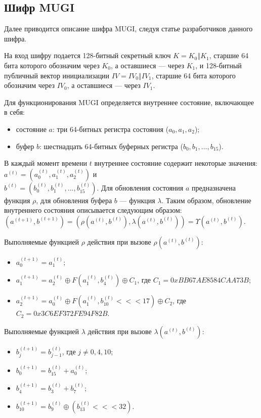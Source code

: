 \documentclass{./civarticle}
\begin{document}
\subsection{Шифр MUGI}
Далее приводится описание шифра MUGI, следуя статье \cite{mugi} разработчиков данного шифра.

На вход шифру подается 128-битный секретный ключ $K = K_0 \mathbin\Vert K_1$, старшие 64 бита которого обозначим через $K_0$, а оставшиеся --- через $K_1$, и 128-битный публичный вектор инициализации $IV = IV_0 \mathbin\Vert IV_1$, старшие 64 бита которого обозначим через $IV_0$, а оставшиеся --- через $IV_1$.

Для функционирования MUGI определяется внутреннее состояние, включающее в себя:
\begin{itemize}
    \item состояние $a$: три 64-битных регистра состояния ($a_0, a_1, a_2$);
    \item буфер $b$: шестнадцать 64-битных буферных регистра ($b_0, b_1, ..., b_{15}$).
\end{itemize}
В каждый момент времени $t$ внутреннее состояние содержит некоторые значения: $a^{(t)} = (a_0^{(t)}, a_1^{(t)}, a_2^{(t)})$ и \\ $b^{(t)} = (b_0^{(t)}, b_1^{(t)}, ..., b_{15}^{(t)})$. Для обновления состояния $a$ предназначена функция $\rho$, для обновления буфера $b$ --- функция $\lambda$. Таким образом, обновление внутреннего состояния описывается следующим образом: \\ $(a^{(t+1)}, b^{(t+1)}) = (\rho(a^{(t)}, b^{(t)}), \lambda(a^{(t)}, b^{(t)})) = \Upsilon(a^{(t)}, b^{(t)})$.


Выполняемые функцией $\rho$ действия при вызове $\rho(a^{(t)}, b^{(t)})$:
\begin{itemize}
    \item $a_0^{(t+1)} = a_1^{(t)}$;
    \item $a_1^{(t+1)} = a_2^{(t)} \oplus F(a_1^{(t)}, b_4^{(t)}) \oplus C_1$, где $C_1 = 0xBB67AE8584CAA73B$;
    \item $a_2^{(t+1)} = a_0^{(t)} \oplus F(a_1^{(t)}, b_{10}^{(t)} <<< 17) \oplus C_2$, где $C_2 = 0x3C6EF372FE94F82B$.
\end{itemize}

Выполняемые функцией $\lambda$ действия при вызове $\lambda(a^{(t)}, b^{(t)})$:
\begin{itemize}
    \item $b_j^{(t+1)} = b_{j-1}^{(t)}$, где $j \neq 0, 4, 10$;
    \item $b_0^{(t+1)} = b_{15}^{(t)} + a_0^{(t)}$;
    \item $b_4^{(t+1)} = b_3^{(t)} + b_7^{(t)}$;
    \item $b_{10}^{(t+1)} = b_9^{(t)} \oplus (b_{13}^{(t)} <<< 32)$.
\end{itemize}
\end{document}
